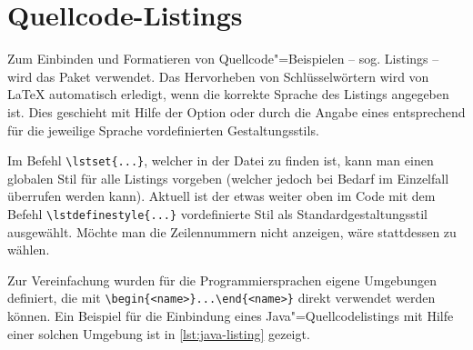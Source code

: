 \section{Quellcode-Listings}%
%
\label{sec:Listings}
%
Zum Einbinden und Formatieren von Quellcode"=Beispielen
-- sog. Listings -- wird das Paket 
\parencite{Hoffmann2014} verwendet.
Das Hervorheben von Schlüsselwörtern
wird von LaTeX automatisch erledigt,
wenn die korrekte Sprache des Listings angegeben ist.
Dies geschieht mit Hilfe der Option 
oder durch die Angabe eines entsprechend für die jeweilige Sprache
vordefinierten Gestaltungsstils.

Im Befehl \lstinline|\lstset{...}|,
welcher in der Datei  zu finden ist,
kann man einen globalen Stil für alle Listings vorgeben
(welcher jedoch bei Bedarf im Einzelfall überrufen werden kann).
Aktuell ist der etwas weiter oben im Code mit dem Befehl
\lstinline|\lstdefinestyle{...}| vordefinierte Stil
 als Standardgestaltungsstil ausgewählt.
Möchte man die Zeilennummern nicht anzeigen, wäre stattdessen
 zu wählen.


Zur Vereinfachung wurden für die \og Programmiersprachen
eigene Umgebungen definiert, die mit \lstinline|\begin{<name>}...\end{<name>}|
direkt verwendet werden können.
Ein Beispiel für die Einbindung eines Java"=Quellcodelistings mit Hilfe einer solchen Umgebung ist in \cref{lst:java-listing} gezeigt.

